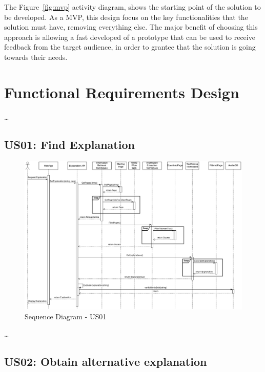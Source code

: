 The Figure~\ref{fig:mvp} activity diagram, shows the starting point of the solution to be developed.
As a \gls{MVP}, this design focus on the key functionalities that the solution must have, removing everything else.
The major benefit of choosing this approach is allowing a fast developed of a prototype that can be used to receive feedback from the target audience, in order to grantee that the solution is going towards their needs.

\section{Functional Requirements Design}

\dots %

\subsection{US01: Find Explanation}

\begin{figure}[H]
\centering
\includegraphics[width=\textwidth,keepaspectratio]{ch4/assets/US01_SD.png}
\caption[Sequence Diagram US01]{Sequence Diagram - US01}
\label{fig:sdus01}
\end{figure}

\dots %

\subsection{US02: Obtain alternative explanation}

